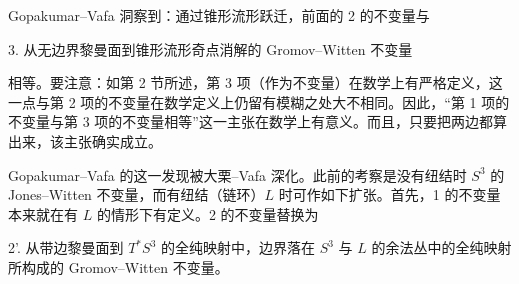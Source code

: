 Gopakumar--Vafa 洞察到：通过锥形流形跃迁，前面的 2 的不变量与

3. 从无边界黎曼面到锥形流形奇点消解的 Gromov--Witten 不变量

相等。要注意：如第 2 节所述，第 3 项（作为不变量）在数学上有严格定义，这一点与第 2 项的不变量在数学定义上仍留有模糊之处大不相同。因此，“第 1 项的不变量与第 3 项的不变量相等”这一主张在数学上有意义。而且，只要把两边都算出来，该主张确实成立。

Gopakumar--Vafa 的这一发现被大栗--Vafa 深化。此前的考察是没有纽结时 $S^{3}$ 的 Jones--Witten 不变量，而有纽结（链环）$L$ 时可作如下扩张。首先，1 的不变量本来就在有 $L$ 的情形下有定义。2 的不变量替换为

2'. 从带边黎曼面到 $T^{*}S^{3}$ 的全纯映射中，边界落在 $S^{3}$ 与 $L$ 的余法丛中的全纯映射所构成的 Gromov--Witten 不变量。


